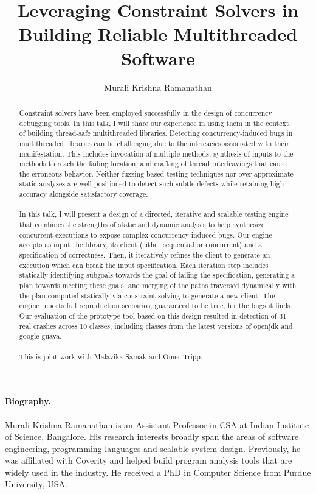 \documentclass[EPiCempty]{easychair}
\begin{document}
\title{Leveraging Constraint Solvers in Building Reliable Multithreaded Software}
\author{Murali Krishna Ramanathan}


\maketitle
\begin{abstract}
Constraint solvers have been employed successfully in the design of concurrency
debugging tools. In this talk, I will share our experience in using them in the
context of building thread-safe multithreaded libraries. Detecting
concurrency-induced bugs in multithreaded libraries can be challenging due to
the intricacies associated with their manifestation. This includes invocation
of multiple methods, synthesis of inputs to the methods to reach the failing
location, and crafting of thread interleavings that cause the erroneous
behavior. Neither fuzzing-based testing techniques nor over-approximate static
analyses are well positioned to detect such subtle defects while retaining high
accuracy alongside satisfactory coverage.
\\\\
In this talk, I will present a design of a directed, iterative and scalable
testing engine that combines the strengths of static and dynamic analysis to
help synthesize concurrent executions to expose complex concurrency-induced
bugs. Our engine accepts as input the library, its client (either sequential or
concurrent) and a specification of correctness. Then, it iteratively refines
the client to generate an execution which can break the input
specification. Each iteration step includes statically identifying subgoals
towards the goal of failing the specification, generating a plan towards
meeting these goals, and merging of the paths traversed dynamically with the
plan computed statically via constraint solving to generate a new client. The
engine reports full reproduction scenarios, guaranteed to be true, for the bugs
it finds. Our evaluation of the prototype tool based on this design resulted in
detection of 31 real crashes across 10 classes, including classes from the
latest versions of openjdk and google-guava.
\\\\
This is joint work with Malavika Samak and Omer Tripp.
\end{abstract}

\paragraph{Biography.} Murali Krishna Ramanathan is an Assistant Professor in
CSA at Indian Institute of Science, Bangalore. His research interests broadly
span the areas of software engineering, programming languages and scalable
system design. Previously, he was affiliated with Coverity and helped build
program analysis tools that are widely used in the industry. He received a PhD
in Computer Science from Purdue University, USA. 
\end{document}
